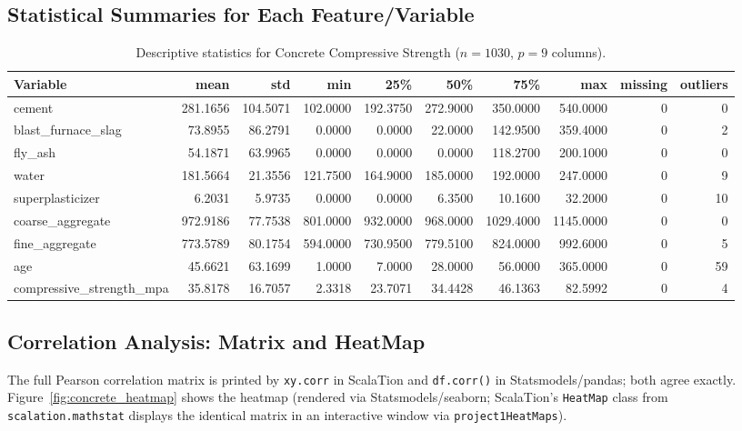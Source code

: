 \subsection{Statistical Summaries for Each Feature/Variable}
\begin{table}[H]
\centering
\small
\begin{tabular}{lrrrrrrrrr}
\toprule
Variable & mean & std & min & 25\% & 50\% & 75\% & max & missing & outliers \\
\midrule
cement & 281.1656 & 104.5071 & 102.0000 & 192.3750 & 272.9000 & 350.0000 & 540.0000 & 0 & 0 \\
blast\_furnace\_slag & 73.8955 & 86.2791 & 0.0000 & 0.0000 & 22.0000 & 142.9500 & 359.4000 & 0 & 2 \\
fly\_ash & 54.1871 & 63.9965 & 0.0000 & 0.0000 & 0.0000 & 118.2700 & 200.1000 & 0 & 0 \\
water & 181.5664 & 21.3556 & 121.7500 & 164.9000 & 185.0000 & 192.0000 & 247.0000 & 0 & 9 \\
superplasticizer & 6.2031 & 5.9735 & 0.0000 & 0.0000 & 6.3500 & 10.1600 & 32.2000 & 0 & 10 \\
coarse\_aggregate & 972.9186 & 77.7538 & 801.0000 & 932.0000 & 968.0000 & 1029.4000 & 1145.0000 & 0 & 0 \\
fine\_aggregate & 773.5789 & 80.1754 & 594.0000 & 730.9500 & 779.5100 & 824.0000 & 992.6000 & 0 & 5 \\
age & 45.6621 & 63.1699 & 1.0000 & 7.0000 & 28.0000 & 56.0000 & 365.0000 & 0 & 59 \\
compressive\_strength\_mpa & 35.8178 & 16.7057 & 2.3318 & 23.7071 & 34.4428 & 46.1363 & 82.5992 & 0 & 4 \\
\bottomrule
\end{tabular}
\caption{Descriptive statistics for Concrete Compressive Strength ($n=1030$, $p=9$ columns).}
\end{table}

\subsection{Correlation Analysis: Matrix and HeatMap}
The full Pearson correlation matrix is printed by \texttt{xy.corr} in ScalaTion and \texttt{df.corr()} in Statsmodels/pandas; both agree exactly. Figure~\ref{fig:concrete_heatmap} shows the heatmap (rendered via Statsmodels/seaborn; ScalaTion's \texttt{HeatMap} class from \texttt{scalation.mathstat} displays the identical matrix in an interactive window via \texttt{project1HeatMaps}).


